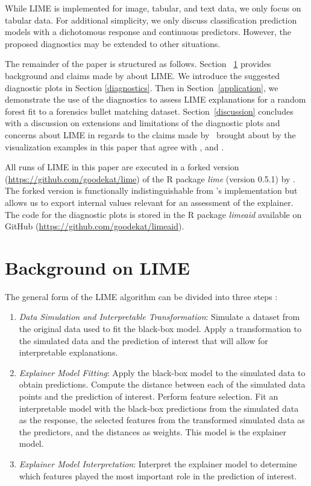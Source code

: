 \documentclass[AMS,STIX2COL]{WileyNJD-v2}\usepackage[]{graphicx}\usepackage[]{color}
\begin{document}
While LIME is implemented for image, tabular, and text data, we only focus on tabular data. For additional simplicity, we only discuss classification prediction models with a dichotomous response  and continuous predictors. However, the proposed diagnostics may be extended to other situations.

The remainder of the paper is structured as follows. Section ~\ref{background} provides background and claims made by \citet{ribeiro:2016} about LIME. We introduce the suggested diagnostic plots in Section \ref{diagnostics}. Then in Section~\ref{application}, we demonstrate the use of the diagnostics to assess LIME explanations for a random forest fit to a forensics bullet matching dataset. Section~\ref{discussion} concludes with a discussion on extensions and limitations of the diagnostic plots and concerns about LIME in regards to the claims made by~\citet{ribeiro:2016} brought about by the visualization examples in this paper that agree with \citet{alvarezmelis:2018, laugel:2018}, and \citet{molnar:2019}.

All runs of LIME in this paper are executed in a forked version (\url{https://github.com/goodekat/lime}) of the R package \emph{lime} (version 0.5.1) by \citet{pedersen:2020}. The forked version is functionally indistinguishable from \citeauthor{pedersen:2020}'s implementation but allows us to export internal values relevant for an assessment of the explainer. The code for the diagnostic plots is stored in the R package \emph{limeaid} available on GitHub (\url{https://github.com/goodekat/limeaid}).

\section{Background on LIME} \label{background}

The general form of the LIME algorithm can be divided into three steps \citep[see also][]{laugel:2018}:

\begin{enumerate}

\item \emph{Data Simulation and Interpretable Transformation}: Simulate a dataset from the original data used to fit the black-box model. Apply a transformation to the simulated data and the prediction of interest that will allow for interpretable explanations.

\item \emph{Explainer Model Fitting}: Apply the black-box model to the simulated data to obtain predictions. Compute the distance between each of the simulated data points and the prediction of interest. Perform feature selection. Fit an interpretable model with the black-box predictions from the simulated data as the response, the selected features from the transformed simulated data as the predictors, and the distances as weights. This model is the explainer model.

\item \emph{Explainer Model Interpretation}: Interpret the explainer model to determine which features played the most important role in the prediction of interest.

\end{enumerate}
\end{document}
